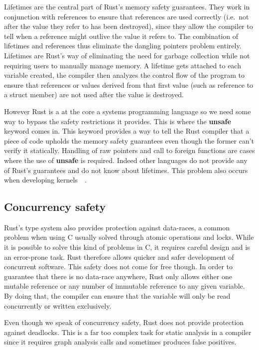 \documentclass[11pt]{article}
\begin{document}
Lifetimes are the central part of Rust's memory safety
guarantees. They work in conjunction with references to ensure
that references are used correctly (i.e.\ not after the value they
refer to has been destroyed), since they allow the compiler to tell
when a reference might outlive the value it refers to. The combination
of lifetimes and references thus eliminate the dangling pointers
problem entirely. Lifetimes are Rust's way of eliminating the need for
garbage collection while not requiring users to manually manage
memory. A lifetime gets attached to each variable created, the
compiler then analyzes the control flow of the program to ensure that
references or values derived from that first value (such as reference
to a struct member) are not used after the value is destroyed.

However Rust is a at the core a systems programming language so we
need some way to bypass the safety restrictions it provides. This is
where the \textbf{unsafe}~\cite{rustonomicon} keyword comes in. This
keyword provides a way to tell the Rust compiler that a piece of code
upholds the memory safety guarantees even though the former can't
verify it statically. Handling of raw pointers and call to foreign
functions are cases where the use of \textbf{unsafe} is
required. Indeed other languages do not provide any of Rust's
guarantees and do not know about lifetimes. This problem also occurs
when developing kernels~\cite{redox}~\cite{rust-os}.

\subsection{Concurrency safety}

Rust's type system also provides protection against data-races, a
common problem when using C usually solved through atomic operations
and locks. While it is possible to solve this kind of problems in C,
it requires careful design and is an error-prone task. Rust therefore
allows quicker and safer development of concurrent software. This safety
does not come for free though. In order to guarantee that there is no
data-race anywhere, Rust only allows either one mutable reference or
any number of immutable reference to any given variable. By doing
that, the compiler can ensure that the variable will only be read
concurrently or written exclusively.

Even though we speak of concurrency safety, Rust does not provide
protection against deadlocks. This is a far too complex task for
static analysis in a compiler since it requires graph analysis calls
and sometimes produces false positives.
\end{document}
